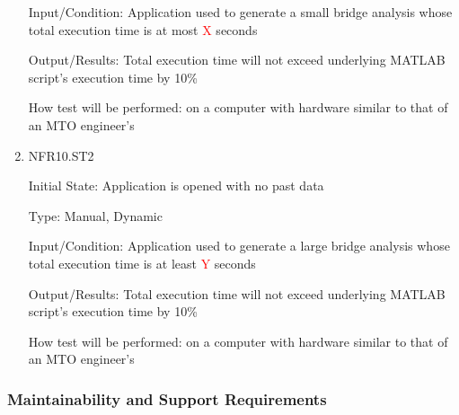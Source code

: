 \documentclass[12pt, titlepage]{article}
\begin{document}
\begin{enumerate}
Input/Condition: Application used to generate a small bridge analysis whose total execution time is at most \textcolor{red}{X} seconds

Output/Results: Total execution time will not exceed underlying MATLAB script's execution time by 10\%

How test will be performed: on a computer with hardware similar to that of an MTO engineer's

\item{NFR10.ST2\\}

Initial State: Application is opened with no past data

Type: Manual, Dynamic

Input/Condition: Application used to generate a large bridge analysis whose total execution time is at least \textcolor{red}{Y} seconds

Output/Results: Total execution time will not exceed underlying MATLAB script's execution time by 10\%

How test will be performed: on a computer with hardware similar to that of an MTO engineer's

\end{enumerate}

\subsubsection{Maintainability and Support Requirements}
\end{document}
